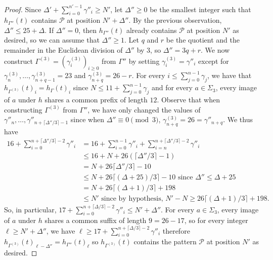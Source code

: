 \documentclass[12pt]{article}
\theoremstyle{definition}
\begin{document}
\begin{proof}
     Since $\Delta' + \sum_{i=0}^{n'-1}\gamma''_i \geq N'$, let $\Delta'' \geq 0$ be the smallest integer such that $h_{\Gamma''}(t)$ contains $\mathcal{P}$ at position $N' + \Delta''$. By the previous observation, $\Delta'' \le 25 + \Delta$. If $\Delta'' = 0$, then $h_{\Gamma''}(t)$ already contains $\mathcal{P}$ at position $N'$ as desired, so we can assume that $\Delta'' \ge 1$. Let $q$ and $r$ be the quotient and the remainder in the Euclidean division of $\Delta''$ by $3$, so $\Delta'' = 3q + r$. We now construct $\Gamma^{(3)} = (\gamma^{(3)}_i)_{i \ge 0}$ from $\Gamma''$ by setting $\gamma^{(3)}_i = \gamma''_i$ except for $\gamma^{(3)}_n, \dots, \gamma^{(3)}_{n + q - 1} = 23$ and $\gamma^{(3)}_{n + q} = 26 - r$. For every $i \le \sum_{j = 0}^{n - 1}\gamma_j$, we have that $h_{\Gamma^{(3)}}(t)_i = h_\Gamma(t)_i$ since $N \le 11 + \sum_{j = 0}^{n - 1}\gamma_j$ and for every $a \in \Sigma_3$, every image of $a$ under $h$ shares a common prefix of length $12$. Observe that when constructing $\Gamma^{(3)}$ from $\Gamma''$, we have only changed the values of $\gamma''_n, \dots, \gamma''_{n + \lceil \Delta''/3\rceil - 1}$ since when $\Delta'' \equiv 0\pmod3$, $\gamma^{(3)}_{n + q} = 26 = \gamma''_{n + q}$. We thus have
    \begin{align*}
        16 + \sum_{i = 0}^{n + \lceil \Delta''/3\rceil - 2}\gamma''_i &= 16 + \sum_{i = 0}^{n - 1}\gamma''_i + \sum_{i = n}^{n + \lceil \Delta''/3\rceil - 2}\gamma''_i\\
        &\le 16 + N + 26(\lceil\Delta''/3\rceil - 1)\\
        &= N + 26\lceil\Delta''/3\rceil -10\\
        &\le N + 26\lceil (\Delta + 25)/3 \rceil -10 \textrm{ since } \Delta'' \leq \Delta + 25\\
        &=N + 26\lceil(\Delta + 1)/3\rceil + 198\\
        &\le N' \textrm{ since by hypothesis, } N' - N \ge 26\lceil(\Delta + 1)/3 \rceil + 198.
    \end{align*}
So, in particular, $17 + \sum_{i=0}^{n + \lceil\Delta/3\rceil-2}\gamma''_i \le N' + \Delta''$. For every $a \in \Sigma_3$, every image of $a$ under $h$ shares a common suffix of length $9 = 26 - 17$, so for every integer $\ell \ge N' + \Delta''$, we have $\ell\ge 17 + \sum_{i=0}^{n + \lceil\Delta/3\rceil-2}\gamma''_i$ therefore $h_{\Gamma^{(3)}}(t)_{\ell - \Delta''} = h_{\Gamma''}(t)_\ell$ so $h_{\Gamma^{(3)}}(t)$ contains the pattern $\mathcal{P}$ at position $N'$ as desired.
\end{proof}
\end{document}
